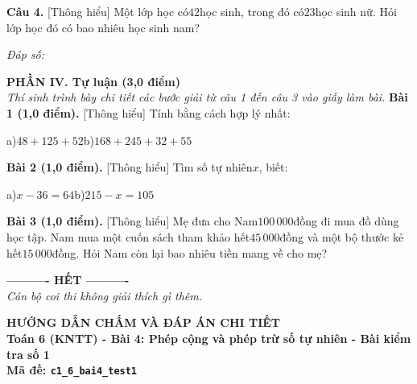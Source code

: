 \documentclass[11pt,a4paper]{article}
\begin{document}
\noindent\textbf{Câu 4.} [Thông hiểu] Một lớp học có$42$học sinh, trong đó có$23$học sinh nữ. Hỏi lớp học đó có bao nhiêu học sinh nam?\par\vspace{2pt}
\noindent\textit{Đáp số:} \dotfill\par\vspace{6pt}


\vspace{6pt}
\noindent
\textbf{\large PHẦN IV. Tự luận (3,0 điểm)}\\
\textit{\small Thí sinh trình bày chi tiết các bước giải từ câu 1 đến câu 3 vào giấy làm bài.}
\vspace{6pt}
\noindent\textbf{Bài 1 (1,0 điểm).} [Thông hiểu] Tính bằng cách hợp lý nhất:\par\noindent a)$48 + 125 + 52$b)$168 + 245 + 32 + 55$\par\vspace{8pt}

\noindent\textbf{Bài 2 (1,0 điểm).} [Thông hiểu] Tìm số tự nhiên$x$, biết:\par\noindent a)$x - 36 = 64$b)$215 - x = 105$\par\vspace{8pt}

\noindent\textbf{Bài 3 (1,0 điểm).} [Thông hiểu] Mẹ đưa cho Nam$100\,000$đồng đi mua đồ dùng học tập. Nam mua một cuốn sách tham khảo hết$45\,000$đồng và một bộ thước kẻ hết$15\,000$đồng. Hỏi Nam còn lại bao nhiêu tiền mang về cho mẹ?\par\vspace{8pt}


\begin{center}
\textbf{---------- HẾT ----------}\\
\textit{\small Cán bộ coi thi không giải thích gì thêm.}
\end{center}

\newpage
\begin{center}
{\Large\bfseries HƯỚNG DẪN CHẤM VÀ ĐÁP ÁN CHI TIẾT}\\[4pt]
{\large\bfseries Toán 6 (KNTT) - Bài 4: Phép cộng và phép trừ số tự nhiên - Bài kiểm tra số 1}\\[2pt]
{\bfseries Mã đề: \texttt{c1\_6\_bai4\_test1}}
\end{center}
\end{document}
